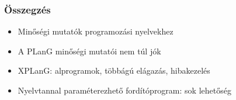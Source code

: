 \documentclass[xcolor=table]{beamer}
\begin{document}
\begin{frame}
	\frametitle{Összegzés}
	\begin{itemize}
		\item Minőségi mutatók programozási nyelvekhez
		\item A PLanG minőségi mutatói nem túl jók
		\item XPLanG: alprogramok, többágú elágazás, hibakezelés
		\item Nyelvtannal paraméterezhető fordítóprogram: sok lehetőség
	\end{itemize}
\end{frame}
\end{document}
